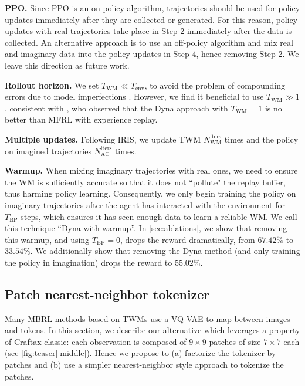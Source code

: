 \textbf{PPO.}
Since PPO \citep{schulman2017proximal} is an on-policy algorithm, trajectories should be used for policy updates immediately after they are collected or generated. 
For this reason, policy updates with real trajectories take place in Step 2 immediately after the data is collected. 
An alternative approach is to use an off-policy algorithm and mix real and imaginary data into the policy updates in Step 4, hence removing Step 2. We leave this direction as future work. 

\textbf{Rollout horizon.}
We set $T_{\text{WM}} \ll  T_{\text{env}}$,
to avoid the problem of compounding errors
due to model imperfections \citep{Lambert2022}.
However, we find it beneficial to use
$T_{\text{WM}} \gg 1$,
consistent with
\citet{Holland2018,van2019use},
who observed that the
Dyna approach with $T_{\text{WM}}=1$
is no better than
MFRL with experience replay.

\textbf{Multiple updates.} Following IRIS, we update TWM $N^{\text{iters}}_{\text{WM}}$ times and the policy on imagined trajectories $N^{\text{iters}}_{\text{AC}}$ times.

\textbf{Warmup.}
When mixing imaginary trajectories with real ones, we need to ensure the WM is sufficiently accurate so that it does not ``pollute" the replay buffer, thus harming policy learning. 
Consequently, we only begin training the policy
on imaginary trajectories after the agent has interacted with the environment for $T_{\text{BP}}$ steps, which ensures it has seen enough data to learn a reliable WM. We call this technique ``Dyna with warmup''. In \cref{sec:ablations}, we show that removing this warmup, and using $T_{\text{BP}}=0$, drops the reward dramatically, from $67.42\%$ to $33.54\%$. We additionally show that removing the Dyna method (and only training the policy in imagination) drops the reward to $55.02\%$. 




\subsection{Patch nearest-neighbor tokenizer}
\label{sec:nnt}
\label{sec:patches}

Many MBRL methods based on TWMs use a VQ-VAE to map between images and tokens.
In this section, we describe our alternative which leverages a property of Craftax-classic: each observation is composed of $9\times9$ patches of size $7 \times 7$ each (see \cref{fig:teaser}[middle]). Hence we propose to (a) factorize the tokenizer by patches and (b) use a simpler nearest-neighbor style approach to tokenize the patches.

